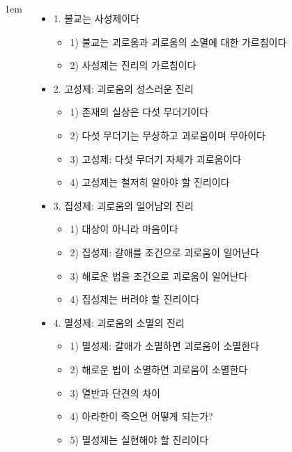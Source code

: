 \documentclass[	14pt, 
							a1paper, 
							portrait, %
							margin=0mm, %
							innermargin=10mm,  		%
							colspace=5mm, 
							subcolspace=0mm
							]{tikzposter}
\begin{document}
\begin{columns}
{\begin{itemize}
					\end{itemize}
			}



			{
					\setlength{\leftmargini}{2em}
					\setlength{\labelsep} {1em}
					\begin{itemize}

					\item 1. 불교는 사성제이다
						\begin{itemize}
						\item 1) 불교는 괴로움과 괴로움의 소멸에 대한 가르침이다
						\item 2) 사성제는 진리의 가르침이다
						\end{itemize}
					\item 2. 고성제: 괴로움의 성스러운 진리
						\begin{itemize}
						\item 1) 존재의 실상은 다섯 무더기이다
						\item 2) 다섯 무더기는 무상하고 괴로움이며 무아이다
						\item 3) 고성제: 다섯 무더기 자체가 괴로움이다
						\item 4) 고성제는 철저히 알아야 할 진리이다
						\end{itemize}

					\item 3. 집성제: 괴로움의 일어남의 진리
						\begin{itemize}
						\item 1) 대상이 아니라 마음이다
						\item 2) 집성제: 갈애를 조건으로 괴로움이 일어난다
						\item 3) 해로운 법을 조건으로 괴로움이 일어난다
						\item 4) 집성제는 버려야 할 진리이다
						\end{itemize}

					\item 4. 멸성제: 괴로움의 소멸의 진리
						\begin{itemize}
						\item 1) 멸성제: 갈애가 소멸하면 괴로움이 소멸한다
						\item 2) 해로운 법이 소멸하면 괴로움이 소멸한다
						\item 3) 열반과 단견의 차이
						\item 4) 아라한이 죽으면 어떻게 되는가?
						\item 5) 멸성제는 실현해야 할 진리이다
						\end{itemize}


\end{itemize}}
\end{columns}
\end{document}
